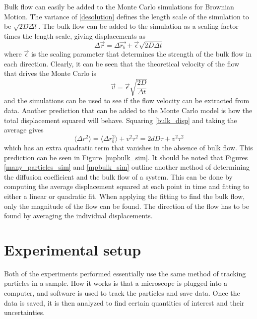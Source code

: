 \documentclass[11pt,letterpaper]{article}
\begin{document}
Bulk flow can easily be added to the Monte Carlo simulations for Brownian
Motion. The variance of \eqref{desolution} defines the length scale of the
simulation to be $\sqrt{2D\Delta t}$. The bulk flow can be added to the
simulation as a scaling factor times the length scale, giving displacements as
\begin{equation}
    \Delta \vec{r} = \Delta \vec{r_b} + \vec{\epsilon} \sqrt{2D\Delta t}
    \label{bulk_disp_sim}
\end{equation}
where $\vec{\epsilon}$ is the scaling parameter that determines the strength of
the bulk flow in each direction. Clearly, it can be seen that the theoretical
velocity of the flow that drives the Monte Carlo is
\begin{equation}
    \vec{v} = \vec{\epsilon} \sqrt{\frac{2D}{\Delta t}}
\end{equation}
and the simulations can be used to see if the flow velocity can be extracted
from data. Another prediction that can be added to the Monte Carlo model is how
the total displacement squared will behave. Squaring \eqref{bulk_disp} and
taking the average gives
\begin{equation}
    \langle \Delta r^2 \rangle = \langle \Delta r_b^2 \rangle + v^2 \tau^2
    = 2dD\tau + v^2 \tau^2
    \label{bulk_flow_model}
\end{equation}
which has an extra quadratic term that vanishes in the absence of bulk flow.
This prediction can be seen in Figure~\ref{mpbulk_sim}. It should be noted that
Figures \ref{many_particles_sim} and \ref{mpbulk_sim} outline another method of
determining the diffusion coefficient and the bulk flow of a system. This can be
done by computing the average displacement squared at each point in time and
fitting to either a linear or quadratic fit. When applying the fitting to find
the bulk flow, only the magnitude of the flow can be found. The direction of the
flow has to be found by averaging the individual displacements.

\section{Experimental setup}


Both of the experiments performed essentially use the same method of tracking
particles in a sample. How it works is that a microscope is plugged into a
computer, and software is used to track the particles and save data. Once the
data is saved, it is then analyzed to find certain quantities of interest and
their uncertainties.
\end{document}
